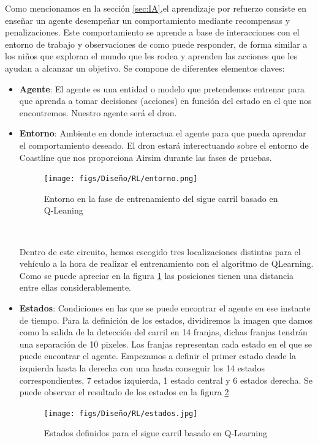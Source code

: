   Como mencionamos en la sección \ref{sec:IA},el aprendizaje por refuerzo consiste en enseñar un agente 
  desempeñar un comportamiento mediante recompensas y penalizaciones. Este comportamiento se aprende a base de interacciones con el entorno de trabajo y observaciones de como puede responder,
  de forma similar a los niños que exploran el mundo que les rodea y aprenden las acciones que les ayudan a alcanzar un objetivo. Se compone de diferentes elementos claves:
  \begin{itemize} 
    \item \textbf{Agente}: El agente es una entidad o modelo que pretendemos entrenar para que aprenda a tomar decisiones (acciones) en función del estado en el que nos encontremos. Nuestro 
    agente será el dron.
    \item \textbf{Entorno}: Ambiente en donde interactua el agente para que pueda aprendar el comportamiento deseado. El dron estará interectuando sobre el entorno de Coastline que nos proporciona Airsim 
    durante las fases de pruebas. 
    \begin{figure} [H]
      \begin{center}
        \texttt{[image: figs/Diseño/RL/entorno.png]}
      \end{center}
      \caption{Entorno en la fase de entrenamiento del sigue carril basado en Q-Leaning}
      \label{fig:Entorno}
    \end{figure}\

    Dentro de este circuito, hemos escogido tres localizaciones distintas para el vehículo a la hora de realizar el entrenamiento con el algoritmo de QLearning. Como se puede apreciar en la figura \ref{fig:Entorno} las posiciones
    tienen una distancia entre ellas considerablemente. 
    \item \textbf{Estados}: Condiciones en las que se puede encontrar el agente en ese instante de tiempo. Para la definición de los estados, dividiremos la imagen que damos como la salida de la detección del carril en 14 franjas, dichas franjas tendrán una 
    separación de 10 pixeles. Las franjas representan cada estado en el que se puede encontrar el agente. Empezamos a definir el primer estado desde la izquierda hasta la derecha con una
    hasta conseguir los 14 estados correspondientes, 7 estados izquierda, 1 estado central y 6 estados derecha. Se puede observar el resultado de los estados en la figura \ref{fig:Estados}

    \begin{figure} [H]
      \begin{center}
        \texttt{[image: figs/Diseño/RL/estados.jpg]}
      \end{center}
      \caption{Estados definidos para el sigue carril basado en Q-Learning}
      \label{fig:Estados}
    \end{figure}\


\end{itemize}
